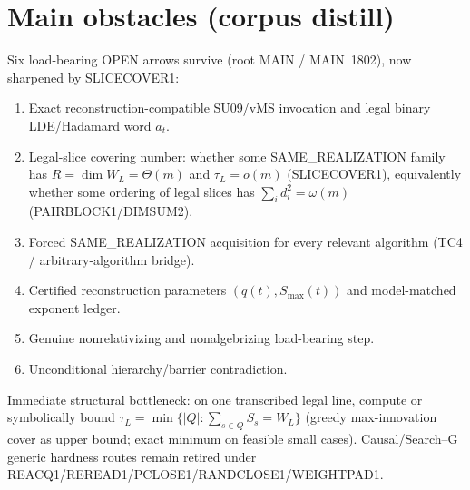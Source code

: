 \documentclass[11pt]{article}
\begin{document}
\section*{Main obstacles (corpus distill)}
Six load-bearing OPEN arrows survive (root MAIN / MAIN~1802), now sharpened by SLICECOVER1:
\begin{enumerate}
\item Exact reconstruction-compatible SU09/vMS invocation and legal binary LDE/Hadamard word $a_t$.
\item Legal-slice covering number: whether some SAME\_REALIZATION family has
$R=\dim W_L=\Theta(m)$ and $\tau_L=o(m)$ (SLICECOVER1), equivalently whether some ordering of legal
slices has $\sum_i d_i^2=\omega(m)$ (PAIRBLOCK1/DIMSUM2).
\item Forced SAME\_REALIZATION acquisition for every relevant algorithm (TC4 / arbitrary-algorithm bridge).
\item Certified reconstruction parameters $(q(t),S_{\max}(t))$ and model-matched exponent ledger.
\item Genuine nonrelativizing and nonalgebrizing load-bearing step.
\item Unconditional hierarchy/barrier contradiction.
\end{enumerate}
Immediate structural bottleneck: on one transcribed legal line, compute or symbolically bound
$\tau_L=\min\{|Q|:\sum_{s\in Q}S_s=W_L\}$ (greedy max-innovation cover as upper bound; exact minimum
on feasible small cases). Causal/Search--G generic hardness routes remain retired under
REACQ1/REREAD1/PCLOSE1/RANDCLOSE1/WEIGHTPAD1.
\end{document}
